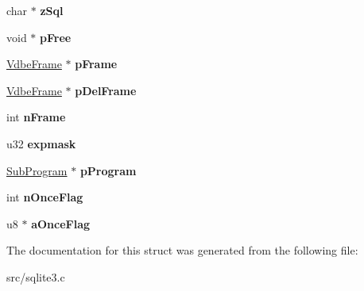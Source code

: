 \begin{DoxyCompactItemize}
\item 
\hypertarget{struct_vdbe_a5a61fd8f84ae0399ef73327e48048ae9}{char $\ast$ {\bfseries z\-Sql}}\label{struct_vdbe_a5a61fd8f84ae0399ef73327e48048ae9}

\item 
\hypertarget{struct_vdbe_a68dcaae5d4f061da3d7bb96c120fe9a4}{void $\ast$ {\bfseries p\-Free}}\label{struct_vdbe_a68dcaae5d4f061da3d7bb96c120fe9a4}

\item 
\hypertarget{struct_vdbe_afd754aaedd6cd5b229fbeff33177fe04}{\hyperlink{struct_vdbe_frame}{Vdbe\-Frame} $\ast$ {\bfseries p\-Frame}}\label{struct_vdbe_afd754aaedd6cd5b229fbeff33177fe04}

\item 
\hypertarget{struct_vdbe_ab8f22136c8bdb4c02962a1ae081e9116}{\hyperlink{struct_vdbe_frame}{Vdbe\-Frame} $\ast$ {\bfseries p\-Del\-Frame}}\label{struct_vdbe_ab8f22136c8bdb4c02962a1ae081e9116}

\item 
\hypertarget{struct_vdbe_a27fbd083a0335ac2b332d37ea2b90bdc}{int {\bfseries n\-Frame}}\label{struct_vdbe_a27fbd083a0335ac2b332d37ea2b90bdc}

\item 
\hypertarget{struct_vdbe_a5e22eedb6ee963a0bcf27fc9fd8b8e43}{u32 {\bfseries expmask}}\label{struct_vdbe_a5e22eedb6ee963a0bcf27fc9fd8b8e43}

\item 
\hypertarget{struct_vdbe_a9239ea72573142101328be15c90de62b}{\hyperlink{struct_sub_program}{Sub\-Program} $\ast$ {\bfseries p\-Program}}\label{struct_vdbe_a9239ea72573142101328be15c90de62b}

\item 
\hypertarget{struct_vdbe_a55e673e0ba209872b23c64c87b36bf56}{int {\bfseries n\-Once\-Flag}}\label{struct_vdbe_a55e673e0ba209872b23c64c87b36bf56}

\item 
\hypertarget{struct_vdbe_a015887ad1c7c597fb78dc08060cb3dc6}{u8 $\ast$ {\bfseries a\-Once\-Flag}}\label{struct_vdbe_a015887ad1c7c597fb78dc08060cb3dc6}

\end{DoxyCompactItemize}


The documentation for this struct was generated from the following file\-:\begin{DoxyCompactItemize}
\item 
src/sqlite3.\-c\end{DoxyCompactItemize}
